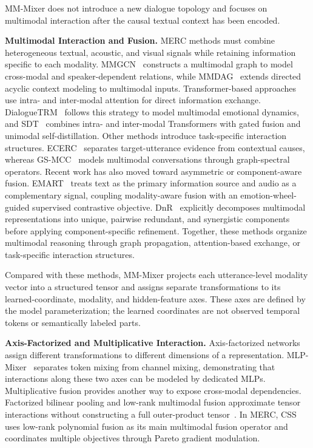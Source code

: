 \documentclass[letterpaper]{article} %
\begin{document}
MM-Mixer does not introduce a new dialogue topology and focuses on multimodal interaction after the causal textual context has been encoded.

\noindent\textbf{Multimodal Interaction and Fusion.}
MERC methods must combine heterogeneous textual, acoustic, and visual signals while retaining information specific to each modality. MMGCN~\cite{mmgcn} constructs a multimodal graph to model cross-modal and speaker-dependent relations, while MMDAG~\cite{mmdag} extends directed acyclic context modeling to multimodal inputs. Transformer-based approaches use intra- and inter-modal attention for direct information exchange. DialogueTRM~\cite{dialoguetrm} follows this strategy to model multimodal emotional dynamics, and SDT~\cite{sdt} combines intra- and inter-modal Transformers with gated fusion and unimodal self-distillation. Other methods introduce task-specific interaction structures. ECERC~\cite{ecerc} separates target-utterance evidence from contextual causes, whereas GS-MCC~\cite{gsmcc} models multimodal conversations through graph-spectral operators. Recent work has also moved toward asymmetric or component-aware fusion. EMART~\cite{emart} treats text as the primary information source and audio as a complementary signal, coupling modality-aware fusion with an emotion-wheel-guided supervised contrastive objective. DnR~\cite{dnr} explicitly decomposes multimodal representations into unique, pairwise redundant, and synergistic components before applying component-specific refinement. Together, these methods organize multimodal reasoning through graph propagation, attention-based exchange, or task-specific interaction structures.

Compared with these methods, MM-Mixer projects each utterance-level modality vector into a structured tensor and assigns separate transformations to its learned-coordinate, modality, and hidden-feature axes. These axes are defined by the model parameterization; the learned coordinates are not observed temporal tokens or semantically labeled parts.

\noindent\textbf{Axis-Factorized and Multiplicative Interaction.}
Axis-factorized networks assign different transformations to different dimensions of a representation. MLP-Mixer~\cite{mlpmixer} separates token mixing from channel mixing, demonstrating that interactions along these two axes can be modeled by dedicated MLPs. Multiplicative fusion provides another way to expose cross-modal dependencies. Factorized bilinear pooling and low-rank multimodal fusion approximate tensor interactions without constructing a full outer-product tensor~\cite{mfb,lmf}. In MERC, CSS~\cite{css} uses low-rank polynomial fusion as its main multimodal fusion operator and coordinates multiple objectives through Pareto gradient modulation.
\end{document}
